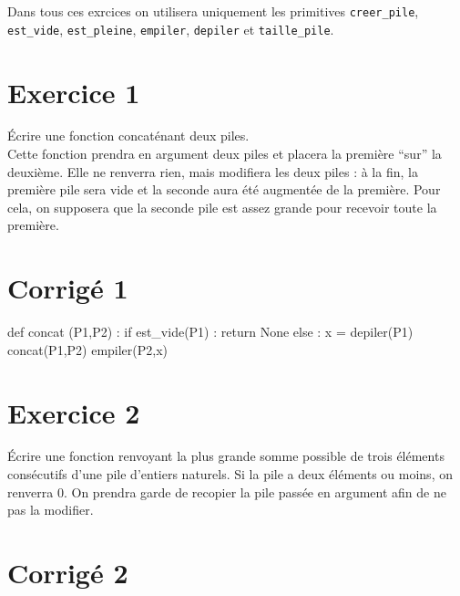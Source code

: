 \documentclass[10pt,fleqn]{book} %
\begin{document}

\vspace{7cm}
\pagestyle{fancy}
\thispagestyle{plain}

\setcounter{secnumdepth}{5}
\def\columnseprulecolor{\color{ocre}}
\setlength{\columnseprule}{0.4pt} 

\ifprof
\else
\begin{multicols}{2}
\fi

Dans tous ces exrcices on utilisera uniquement les primitives \texttt{creer\_pile}, \texttt{est\_vide}, 
\texttt{est\_pleine}, \texttt{empiler}, \texttt{depiler} et \texttt{taille\_pile}.

\section*{Exercice 1}

Écrire une fonction concaténant deux piles. \\
Cette fonction prendra en argument deux piles et placera la première ``sur'' la deuxième. Elle ne renverra rien, mais 
modifiera les deux piles : à la fin, la première pile sera vide et la seconde aura été augmentée de la première. Pour 
cela, on supposera que la seconde pile est assez grande pour recevoir toute la première.


\section*{Corrigé 1}

\begin{python}
def concat (P1,P2) :
    if est_vide(P1) :
	return None
    else :
	x = depiler(P1)
	concat(P1,P2)
	empiler(P2,x)
\end{python} 


\section*{Exercice 2}

Écrire une fonction renvoyant la plus grande somme possible de trois éléments consécutifs d'une pile d'entiers 
naturels. Si la pile a deux éléments ou moins, on renverra 0. On prendra garde de recopier la pile passée en argument 
afin de ne pas la modifier.

\section*{Corrigé 2}


\end{multicols}
\end{document}

